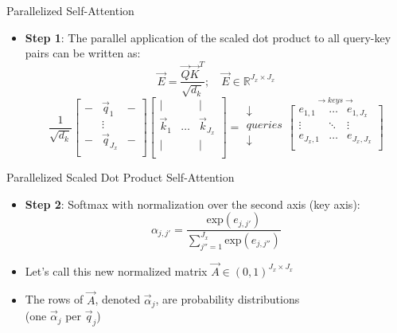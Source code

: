 \begin{vbframe}{Parallelized Self-Attention}

\vfill

\begin{itemize}
\item \textbf{Step 1}: The parallel application of the scaled dot product to all query-key pairs can be written as:
$$\vec {E} = \frac{ \vec {Q} \vec {K}^T}{\sqrt{d_k}}; \quad \vec E \in \mathbb{R}^{J_x \times J_x}$$
$$ \frac{1}{\sqrt{d_k}}
\begin{bmatrix}
- & \vec q_1  & -  \\
& \vdots & \\
-  & \vec q_{J_x}  &  -  \\
\end{bmatrix}
\begin{bmatrix}
\lvert &  & \lvert  \\
\vec k_1 & \ldots & \vec k_{J_x} \\
\lvert &  & \lvert  \\
\end{bmatrix}
=
\begin{matrix} \downarrow \\ queries \\ \downarrow \\ \end{matrix} \overset{\rightarrow keys \rightarrow}{
\begin{bmatrix}
e_{1,1} & \ldots & e_{1,J_x} \\
\vdots & \ddots & \vdots \\
e_{J_x,1} & \ldots & e_{J_x,J_x} \\
\end{bmatrix}}$$
\end{itemize}

\vfill

\end{vbframe}

\begin{vbframe}{Parallelized Scaled Dot Product Self-Attention}

\vfill

\begin{itemize}
\item \textbf{Step 2}: Softmax with normalization over the second axis (key axis):
$$\alpha_{j,j'} = \frac{\mathrm{exp}(e_{j,j'})}{\sum_{j''=1}^{J_x} \mathrm{exp}(e_{j,j''})}$$
\item Let's call this new normalized matrix $\vec A \in (0,1)^{J_x \times J_x}$
\item The rows of $\vec A$, denoted $\vec \alpha_j$, are probability distributions\\ (one $\vec \alpha_j$ per $\vec q_j$)
\end{itemize}

\vfill

\end{vbframe}

